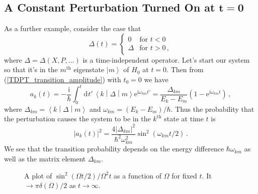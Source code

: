 \documentclass{article}
\theoremstyle{plain}\theoremheaderfont{\normalfont\itshape}\theorembodyfont{\rmfamily}\theoremseparator{.}\newtheorem*{rem}{Remark}\newtheorem*{ex}{Example}\newtheorem*{proof}{Proof}\newtheorem*{altp}{Alternative proof}
\theoremstyle{plain}\theoremheaderfont{\normalfont\bfseries}\theorembodyfont{\rmfamily}\theoremseparator{.}\newtheorem{thm}{Theorem}[section]\newtheorem{lem}[thm]{Lemma}\newtheorem{prop}[thm]{Proposition}\newtheorem*{cor}{Corollary}\newtheorem{defn}[thm]{Definition}\newtheorem{clm}[thm]{Claim}\newtheorem{clminproof}{Claim}
\theoremstyle{break}\theoremheaderfont{\normalfont\itshape}\theorembodyfont{\rmfamily}\theoremseparator{.\medskip}\newtheorem*{proofskip}{Proof}\newtheorem*{exs}{Examples}\newtheorem*{rems}{Remarks}
\theoremstyle{break}\theoremheaderfont{\normalfont\bfseries}\theorembodyfont{\rmfamily}\theoremseparator{.\medskip}\newtheorem{lemskip}[thm]{Lemma}\newtheorem{defnskip}[thm]{Definition}\newtheorem{propskip}[thm]{Proposition}\newtheorem{thmskip}[thm]{Theorem}
\numberwithin{equation}{section}
\newcommand{\ii}{\mathrm{i}}
\newcommand{\ee}{\mathrm{e}}
\newcommand{\dd}[2][]{\mathrm{d}^{#1} #2\,}
\newcommand{\ket}[1]{\left| #1 \right\rangle}
\newcommand{\mel}[3]{\left\langle #1 \middle| #2 \middle| #3 \right\rangle}
\newcommand{\abs}[1]{\left| #1 \right|}
\begin{document}
    \subsection{A Constant Perturbation Turned On at \texorpdfstring{\(\bm{t=0}\)}{t=0}}
    As a further example, consider the case that
    \begin{equation}
        \Delta(t)=\begin{cases}
            0 & \text{for }t<0\\
            \Delta & \text{for }t>0\,,
        \end{cases}
    \end{equation}
    where \(\Delta=\Delta(X,P,\dots)\) is a time-independent operator. Let's start our system so that it's in the \(m^{\text{th}}\) eigenstate \(\ket{m}\) of \(H_0\) at \(t=0\). Then from (\ref{TDPT_transition_amplitude}) with \(t_0=0\) we have
    \begin{equation}\label{constant_perturbation_ak}
        a_k(t)=-\frac{\ii}{\hbar}\int_{0}^{t}\dd{t'}\mel{k}{\Delta}{m}\ee^{\ii \omega_{km}t'}=\frac{\Delta_{km}}{E_k-E_m}(1-\ee^{\ii \omega_{km}t})\,,
    \end{equation}
    where \(\Delta_{km}=\mel{k}{\Delta}{m}\) and \(\omega_{km}=(E_k-E_m)/\hbar\). Thus the probability that the perturbation causes the system to be in the \(k^{\text{th}}\) state at time \(t\) is
    \begin{equation}
        \abs{a_k(t)}^2=\frac{4\abs{\Delta_{km}}^2}{\hbar^2\omega_{km}^2}\sin^2(\omega_{km}t/2)\,.
    \end{equation}
    We see that the transition probability depends on the energy difference \(\hbar\omega_{km}\) as well as the matrix element \(\Delta_{km}\).

    \begin{figure}
        \centering
        \caption{A plot of \(\sin^2(\Omega t/2)/\Omega^2 t\) as a function of \(\Omega\) for fixed \(t\). It \(\to\pi\delta(\Omega)/2\) as \(t\to\infty\).}
        \label{Fig:Const_Per}
    \end{figure}
\end{document}
